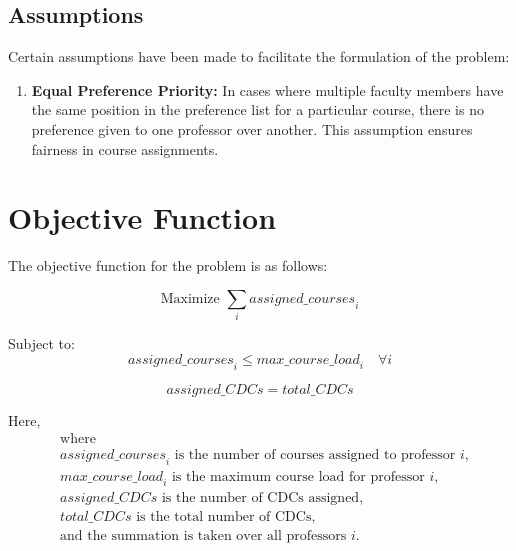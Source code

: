 \documentclass{article}
\begin{document}
\subsection{Assumptions}

Certain assumptions have been made to facilitate the formulation of the problem:

\begin{enumerate}
    \item \textbf{Equal Preference Priority:} In cases where multiple faculty members have the same position in the preference list for a particular course, there is no preference given to one professor over another. This assumption ensures fairness in course assignments.
\end{enumerate}
\newpage
{}
\section{Objective Function}

The objective function for the problem is as follows:


    \begin{equation}
\text{Maximize } \sum_{i} \mathit{assigned\_courses}_i
\end{equation}

Subject to:
\begin{equation}
\mathit{assigned\_courses}_i \leq \mathit{max\_course\_load}_i \quad \forall i
\end{equation}

\begin{equation}
\mathit{assigned\_CDCs} = \mathit{total\_CDCs}
\end{equation}

Here,
\begin{align*}
&\text{where } \\
&\mathit{assigned\_courses}_i \text{ is the number of courses assigned to professor } i, \\
&\mathit{max\_course\_load}_i \text{ is the maximum course load for professor } i, \\
&\mathit{assigned\_CDCs} \text{ is the number of CDCs assigned,} \\
&\mathit{total\_CDCs} \text{ is the total number of CDCs,} \\
&\text{and the summation is taken over all professors } i.
\end{align*}
\end{document}

